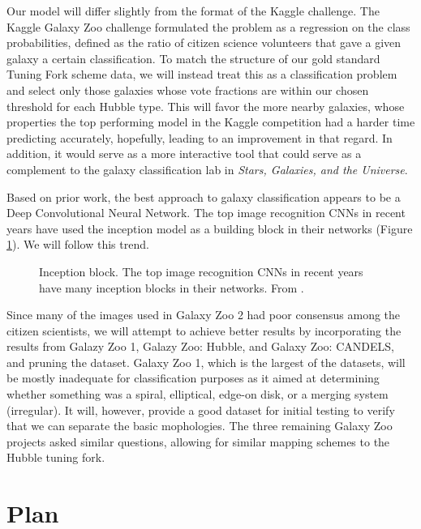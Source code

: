 \documentclass[twocolumn]{aastex6}
\begin{document}
Our model will differ slightly from the format of the Kaggle challenge. The Kaggle Galaxy Zoo challenge formulated the problem as a regression on the class probabilities, defined as the ratio of citizen science volunteers that gave a given galaxy a certain classification. To match the structure of our gold standard Tuning Fork scheme data, we will instead treat this as a classification problem and select only those galaxies whose vote fractions are within our chosen threshold for each Hubble type. This will favor the more nearby galaxies, whose properties the top performing model in the Kaggle competition had a harder time predicting accurately, hopefully, leading to an improvement in that regard. In addition, it would serve as a more interactive tool that could serve as a complement to the galaxy classification lab in \emph{Stars, Galaxies, and the Universe}.

Based on prior work, the best approach to galaxy classification appears to be a Deep Convolutional Neural Network. The top image recognition CNNs in recent years have used the inception model \citep{2014arXiv1409.4842S} as a building block in their networks (Figure \ref{fig:inception}). We will follow this trend.

\begin{figure}[!t]
\caption{Inception block. The top image recognition CNNs in recent years have many inception blocks in their networks. From \citep{2014arXiv1409.4842S}.}
\label{fig:inception}
\end{figure}


Since many of the images used in Galaxy Zoo 2 had poor consensus among the citizen scientists, we will attempt to achieve better results by incorporating the results from Galazy Zoo 1, Galazy Zoo: Hubble, and Galaxy Zoo: CANDELS, and pruning the dataset. Galaxy Zoo 1, which is the largest of the datasets, will be mostly inadequate for classification purposes as it aimed at determining whether something was a spiral, elliptical, edge-on disk, or a merging system (irregular). It will, however, provide a good dataset for initial testing to verify that we can separate the basic mophologies. The three remaining Galaxy Zoo projects asked similar questions, allowing for similar mapping schemes to the Hubble tuning fork.


\section{Plan}
\end{document}
